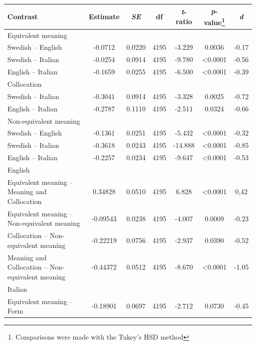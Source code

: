 \documentclass[output=paper,colorlinks,citecolor=brown,nonflat]{langsci/langscibook}
\begin{document}
\begin{table}
\small
    \begin{tabular}{>{\raggedright}p{3.75cm} S[table-format=-1.4] S[table-format=1.4] S[table-format=3.0] S[table-format=-1.4] S[table-format=<1.4] S[table-format=-1.2] }
    \lsptoprule
         Contrast & {Estimate} & {\textit{SE}} & {df} & {\textit{t}-ratio} & {\textit{p}-value\footnote{Comparisons were made with the Tukey’s HSD method}} & {\textit{d}}\\
    \midrule
      Equivalent meaning & & \\
        Swedish -- English & -0.0712 & 0.0220 & 4195 & -3.229 & 0.0036 & -0.17\\
        Swedish -- Italian & -0.0254 & 0.0914 & 4195 & -9.780 & <0.0001 & -0.56\\
        English -- Italian & -0.1659 & 0.0255 & 4195 & -6.500 & <0.0001 & -0.39\\
        \tablevspace
        Collocation & & \\
        Swedish -- Italian & -0.3041 & 0.0914 & 4195 & -3.328 & 0.0025 & -0.72\\
        English -- Italian & -0.2787 & 0.1110 & 4195 & -2.511 & 0.0324 & -0.66\\
        \tablevspace
        Non-equivalent meaning & & \\
        Swedish -- English & -0.1361 & 0.0251 & 4195 & -5.432 & <0.0001 & -0.32\\
        Swedish -- Italian & -0.3618 & 0.0243 & 4195 & -14.888 & <0.0001 & -0.85\\
        English -- Italian & -0.2257 & 0.0234 & 4195 & -9.647 & <0.0001 & -0.53\\
        \tablevspace
        English & & \\
        Equivalent meaning -- Meaning and Collocation & 0.34828 & 0.0510 & 4195 & 6.828 & <0.0001 & 0,42\\
        Equivalent meaning -- Non-equivalent meaning & -0.09543 & 0.0238 & 4195 & -4.007 & 0.0009 & -0.23\\
        Collocation -- Non-equivalent meaning & -0.22219 & 0.0756 & 4195 & -2.937 & 0.0390 & -0.52\\
        Meaning and Collocation -- Non-equivalent meaning & -0.44372 & 0.0512 & 4195 & -8.670 & <0.0001 & -1.05\\
        \tablevspace
        Italian & & \\
        Equivalent meaning -- Form & -0.18901 & 0.0697 & 4195 & -2.712 & 0.0730 & -0.45\\

\end{tabular}
\end{table}
\end{document}
